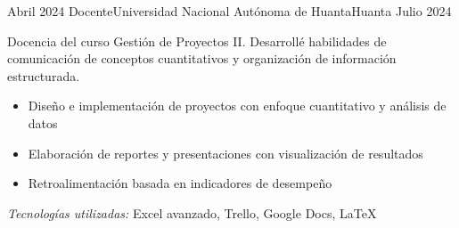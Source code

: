 \experience
{Abril 2024} {Docente}{Universidad Nacional Autónoma de Huanta}{Huanta}
{Julio 2024} {
	Docencia del curso Gestión de Proyectos II. Desarrollé habilidades de comunicación de conceptos cuantitativos y organización de información estructurada.
	\begin{itemize}
		\item Diseño e implementación de proyectos con enfoque cuantitativo y análisis de datos
		\item Elaboración de reportes y presentaciones con visualización de resultados
		\item Retroalimentación basada en indicadores de desempeño
	\end{itemize}
}
{\footnotesize{\emph{Tecnologías utilizadas:} Excel avanzado, Trello, Google Docs, LaTeX}}
